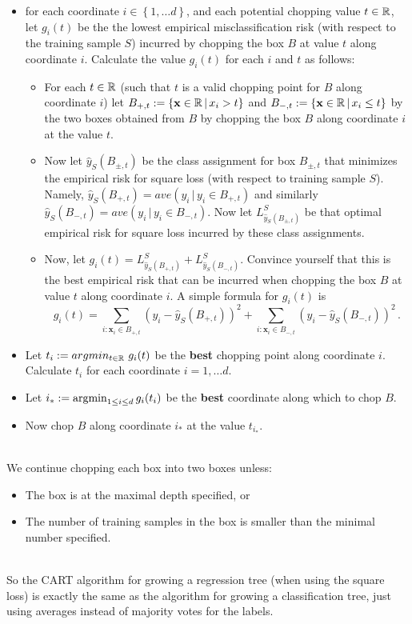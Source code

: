 \documentclass[11pt]{article}
\newcommand{\V}[1]{\mathbf{#1}}
\newcommand{\VV}[1]{\mathbf{#1}}
\begin{document}
 \begin{itemize}
  \item for each coordinate $i\in\left\{ 1,\ldots d \right\}$, and each
    potential chopping value $t\in\mathbb{R}$, let $g_i(t)$ be the 
    the lowest empirical misclassification risk (with respect to the training
    sample $S$) incurred by
      chopping the box $B$ at value $t$ along coordinate $i$.
      Calculate the value $g_i(t)$ for each $i$ and $t$ as follows: 
    \begin{itemize}
      \item For each $t\in\mathbb{R}$ (such that $t$ is a valid chopping point for
	$B$ along coordinate $i$) let 
	$B_{+,t} := \left\{ \VV{x}\in\reals\,|\, x_{i}>t \right\}$ 
	and 
	$B_{-,t} := \left\{ \VV{x}\in\reals\,|\, x_{i}\leq t \right\}$ 
	by the two boxes obtained from $B$ by chopping the box $B$ along
	coordinate $i$ at the value $t$. 
      \item Now let $\hat{y}_S(B_{\pm,t})$ be the class assignment
	for box $B_{\pm,t}$ that minimizes the empirical  risk for square loss (with respect to
        training sample $S$). Namely, $\hat{y}_S(B_{+,t})=
        ave(y_i\,|\, y_i\in B_{+,t})$ and similarly 
        $\hat{y}_S(B_{-,t})=
        ave(y_i\,|\, y_i\in B_{-,t})$. Now 
      let
        $L^S_{\hat{y}_S(B_{\pm,t})}$ be that optimal empirical
        risk for square loss incurred by these class assignments.
    \item Now, let $g_i(t) = L^S_{\hat{y}_S(B_{+,t})} +
      L^S_{\hat{y}_S(B_{-,t})}$. Convince yourself that this is
      the best empirical risk that can be incurred when
      chopping the box $B$ at value $t$ along coordinate $i$. 
      A simple formula for $g_i(t)$ is 
      \[
        g_i(t) = \sum_{i:\V{x}_i\in B_{+,t}} (y_i-\hat{y}_S(B_{+,t}))^2 
        + \sum_{i:\V{x}_i\in B_{-,t}} (y_i-\hat{y}_S(B_{-,t}))^2  \,.
      \]
    \end{itemize}

  \item Let $t_i := argmin_{t\in\mathbb{R}}\,\, g_i(t)$ be the {\bf best} chopping point along
    coordinate $i$. Calculate $t_i$ for each coordinate $i=1,\ldots d$.
  \item Let $i_* := \operatorname*{argmin}_{1\leq i \leq d} g_i(t_i)$ be the {\bf best} coordinate along which to chop $B$.
  \item Now chop $B$ along coordinate $i_*$ at the value $t_{i_*}$.
\end{itemize}
~\\
We continue chopping each box into two boxes unless:
\begin{itemize}
  \item The box is at the maximal depth specified, or
  \item The number of training samples in the box is smaller than the minimal
    number specified.
\end{itemize}
~\\
So the CART algorithm for growing a regression tree (when using the square loss)
is exactly the same as the
algorithm for growing a classification tree, just using averages instead of
majority votes for the labels.
\end{document}
